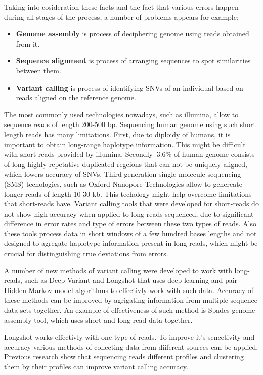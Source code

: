 \documentclass[a4paper, 12pt]{article}
\theoremstyle{definition}
\theoremstyle{definition}
\theoremstyle{remark}
\begin{document}
Taking into cosideration these facts and the fact that various 
errors happen during all stages of the process, a number of 
problems appears for example:
\begin{itemize}
    \item \textbf{Genome assembly} is process of  
    deciphering genome using reads obtained from it.
    
    \item \textbf{Sequence alignment} is process of 
    arranging sequences to spot similarities between them. 
    
    \item \textbf{Variant calling} is process of identifying 
    SNVs of an individual based on reads aligned on the reference genome.
\end{itemize}

The most commonly used technologies nowadays, 
such as illumina, allow to sequence reads of length 200-500 bp.
Sequencing human genome using such short length reads 
has many limitations. 
First, due to diploidy of humans, it is important to obtain
long-range haplotype information. This might be difficult 
with short-reads provided by illumina. Secondly $~3.6\%$ of 
human genome consists of long highly repetative 
duplicated regeions that can not be uniquely aligned, 
which lowers accuracy of SNVs. 
Third-generation single-molecule sequencing (SMS) techologies,
such as Oxford Nanopore Technologies allow to   
genereate longer reads of length 10-30 kb. 
This techology might help overcome limitations that 
short-reads have. Variant calling tools that were developed 
for short-reads do not show high accuracy when applied 
to long-reads sequenced, due to significant difference 
in error rates and type of errors between these two types of reads. 
Also these tools process data in short windows 
of a few hundred bases lengths and not designed to agregate  
haplotype information present in long-reads, 
which might be crucial for distinguishing true deviations 
from errors.  

A number of new methods of variant calling were developed 
to work with long-reads, such as Deep Variant
and Longshot that uses deep learning 
and pair-Hidden Markov model algorithms to effectivly work with 
such data.  
Accuracy of these methods can be improved by agrigating 
information from multiple sequence data sets together. 
An example of effectiveness of such method is 
Spades genome assembly tool, which uses short and long 
read data together.  

Longshot works effectivly with one type of reads. 
To improve it's sencetivity and accuracy various 
methods of collecting data from diiferent sources 
can be applied. 
Previous research show that sequencing reads 
different profiles and clustering them 
by their profiles can improve variant calling accuracy.
\end{document}
